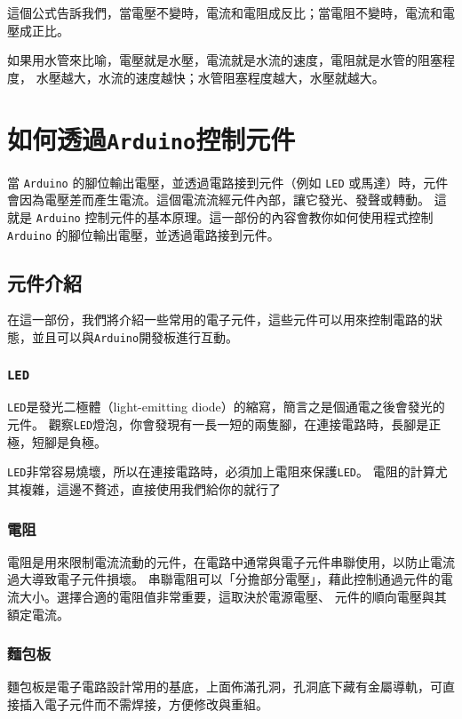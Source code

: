 \documentclass[12pt,a4paper]{article}
\begin{document}
這個公式告訴我們，當電壓不變時，電流和電阻成反比；當電阻不變時，電流和電壓成正比。

如果用水管來比喻，電壓就是水壓，電流就是水流的速度，電阻就是水管的阻塞程度，
水壓越大，水流的速度越快；水管阻塞程度越大，水壓就越大。

\section{如何透過\texttt{Arduino}控制元件}

當 \texttt{Arduino} 的腳位輸出電壓，並透過電路接到元件（例如 \texttt{LED} 或馬達）時，元件會因為電壓差而產生電流。這個電流流經元件內部，讓它發光、發聲或轉動。
這就是 \texttt{Arduino} 控制元件的基本原理。這一部份的內容會教你如何使用程式控制 \texttt{Arduino} 的腳位輸出電壓，並透過電路接到元件。

\subsection{元件介紹}
在這一部份，我們將介紹一些常用的電子元件，這些元件可以用來控制電路的狀態，並且可以與\texttt{Arduino}開發板進行互動。

\subsubsection{\texttt{LED}}

\texttt{LED}是發光二極體（light-emitting diode）的縮寫，簡言之是個通電之後會發光的元件。
觀察\texttt{LED}燈泡，你會發現有一長一短的兩隻腳，在連接電路時，長腳是正極，短腳是負極。

\texttt{LED}非常容易燒壞，所以在連接電路時，必須加上電阻來保護\texttt{LED}。
電阻的計算尤其複雜，這邊不贅述，直接使用我們給你的就行了

\subsubsection{電阻}
電阻是用來限制電流流動的元件，在電路中通常與電子元件串聯使用，以防止電流過大導致電子元件損壞。
串聯電阻可以「分擔部分電壓」，藉此控制通過元件的電流大小。選擇合適的電阻值非常重要，這取決於電源電壓、
元件的順向電壓與其額定電流。


\subsubsection{麵包板}

麵包板是電子電路設計常用的基底，上面佈滿孔洞，孔洞底下藏有金屬導軌，可直接插入電子元件而不需焊接，方便修改與重組。
\end{document}
